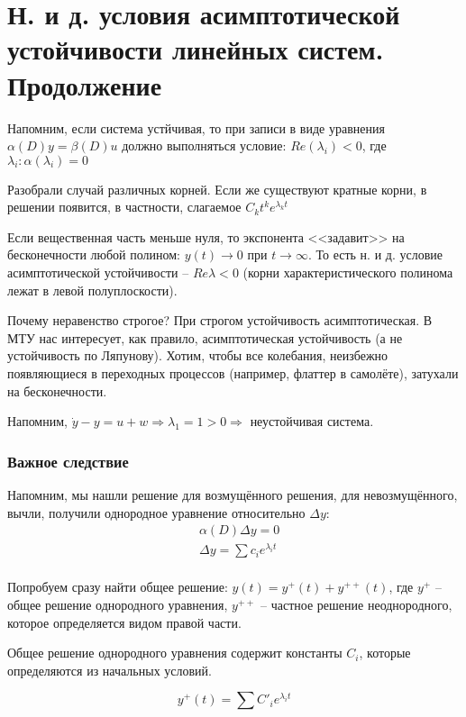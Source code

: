 \documentclass[main.tex]{subfiles}
\begin{document}
\section{Н. и д. условия асимптотической устойчивости линейных систем. Продолжение}

Напомним, если система устйчивая, то при записи в виде уравнения $\alpha(D)y =\beta(D)u$ должно выполняться условие: $Re(\lambda_i) < 0$, где $\lambda_i : \alpha(\lambda_i) = 0$

Разобрали случай различных корней.
Если же существуют кратные корни, в решении появится, в частности, слагаемое $ C_kt^k e^{\lambda_k t} $

Если вещественная часть меньше нуля, то экспонента <<задавит>> на бесконечности любой полином: $ y(t) \to 0 $ при $ t \to \infty $.
То есть н. и д. условие асимптотической устойчивости -- $ \boxed{Re \lambda < 0} $ (корни характеристического полинома лежат в левой полуплоскости).

Почему неравенство строгое?
При строгом устойчивость асимптотическая.
В МТУ нас интересует, как правило, асимптотическая устойчивость (а не устойчивость по Ляпунову).
Хотим, чтобы все колебания, неизбежно появляющиеся в  переходных процессов (например, флаттер в самолёте), затухали на бесконечности.

Напомним, $ \dot y - y = u + w \Rightarrow \lambda_1 = 1 > 0 \Rightarrow $ неустойчивая система.

\subsubsection{Важное следствие}

Напомним, мы нашли решение для возмущённого решения, для невозмущённого, вычли, получили однородное уравнение относительно $ \Delta y $:
\begin{align*}
    & \alpha(D) \Delta y = 0 \\
    & \Delta y = \sum c_i e^{\lambda_i t} \\
\end{align*}

Попробуем сразу найти общее решение: $ y(t) = y^+(t) + y^{++}(t) $, где $y^+$ -- общее решение однородного уравнения, $y^{++}$ -- частное решение неоднородного, которое определяется видом правой части.

Общее решение однородного уравнения содержит константы $ C_i $, которые определяются из начальных условий.

$$ y^+(t) = \sum C'_i e^{\lambda_i t} $$
\end{document}
